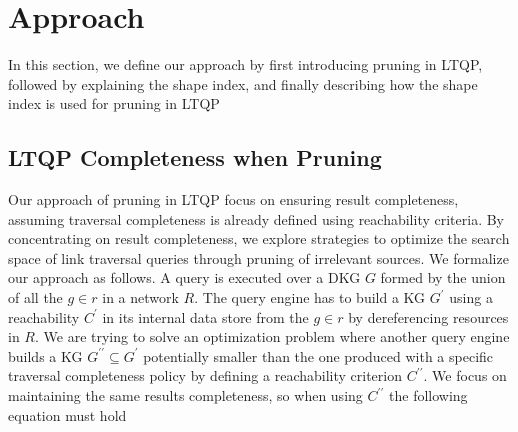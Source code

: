 \section{Approach}\label{sec:approach}






In this section, we define our approach by first introducing pruning in LTQP, followed by explaining the shape index, and finally describing how the shape index is used for pruning in LTQP

\subsection{LTQP Completeness when Pruning}\label{sec:slde}

Our approach of pruning in LTQP focus on ensuring result completeness, assuming traversal completeness is already defined using reachability criteria.
By concentrating on result completeness, we explore strategies to optimize the search space of link traversal queries through pruning of irrelevant sources.
We formalize our approach as follows.
A query is executed over a DKG $G$ formed by the union of all the $g \in r$ in a network $R$.
The query engine has to build a KG $G^{\prime}$ using a reachability $C^{\prime}$ in its internal data store from the $g \in r$ by dereferencing resources in $R$.
We are trying to solve an optimization problem where another query engine builds a KG
$G^{\prime\prime} \subseteq G^{\prime}$
potentially smaller than the one produced with a specific traversal completeness policy
by defining a reachability criterion $C^{\prime\prime}$.
We focus on maintaining the same results completeness, so when using $C^{\prime\prime}$ the following equation must hold

